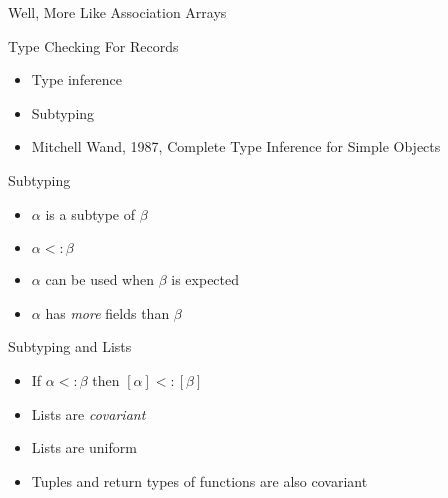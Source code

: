 \documentclass{beamer}
\begin{document}
\begin{frame}[fragile]{Well, More Like Association Arrays}


\end{frame}


\begin{frame}{Type Checking For Records}
\begin{itemize}
  \item Type inference
  \item Subtyping
  \item Mitchell Wand, 1987, Complete Type Inference for Simple Objects
\end{itemize}
\end{frame}

\begin{frame}{Subtyping}
\begin{itemize}
  \item $\alpha$ is a subtype of $\beta$
  \item $\alpha <: \beta$
  \item $\alpha$ can be used when $\beta$ is expected
  \item $\alpha$ has \emph{more} fields than $\beta$
\end{itemize}
\end{frame}

\begin{frame}{Subtyping and Lists}
\begin{itemize}%
  \item If $\alpha <: \beta$ then $[\alpha] <: [\beta]$
  \item Lists are \emph{covariant}
  \item Lists are uniform
  \item Tuples and return types of functions are also covariant
\end{itemize}
\end{frame}
\end{document}
